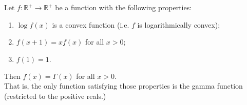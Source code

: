 \documentclass[12pt]{article}
\begin{document}
Let $f:\mathbb{R}^+\rightarrow \mathbb{R^+}$ be a function with the following properties:
\begin{enumerate}
\item $\log f(x)$ is a convex function (i.e. $f$ is logarithmically convex);
\item $f(x+1) = xf(x)$ for all $x>0$;
\item $f(1)=1.$
\end{enumerate}
Then $f(x)=\Gamma(x)$ for all $x>0$.\\
That is, the only function satisfying those properties is the gamma function (restricted to the positive reals.)
\end{document}
